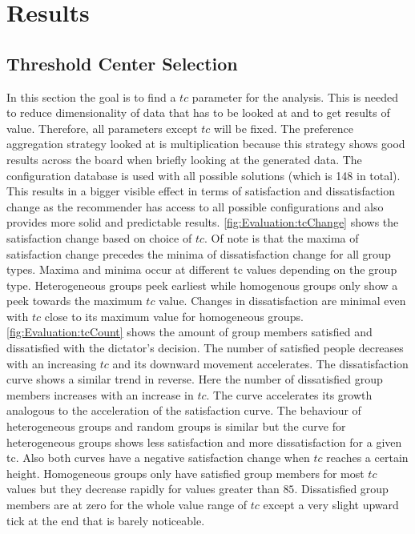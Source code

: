 \section{Results}
\label{sec:Evaluation:Findings}

\subsection{Threshold Center Selection}

In this section the goal is to find a $tc$ parameter for the analysis. This is needed to reduce dimensionality of data that has to be looked at and to get results of value. Therefore, all parameters except $tc$ will be fixed. The preference aggregation strategy looked at is multiplication because this strategy shows good results across the board when briefly looking at the generated data. The configuration database is used with all possible solutions (which is 148 in total). This results in a bigger visible effect in terms of satisfaction and dissatisfaction change as the recommender has access to all possible configurations and also provides more solid and predictable results. \autoref{fig:Evaluation:tcChange} shows the satisfaction change based on choice of $tc$. Of note is that the maxima of satisfaction change precedes the minima of dissatisfaction change for all group types. Maxima and minima occur at different tc values depending on the group type. Heterogeneous groups peek earliest while homogenous groups only show a peek towards the maximum $tc$ value. Changes in dissatisfaction are minimal even with $tc$ close to its maximum value for homogeneous groups. \autoref{fig:Evaluation:tcCount} shows the amount of group members satisfied and dissatisfied with the dictator's decision. The number of satisfied people decreases with an increasing $tc$ and its downward movement accelerates. The dissatisfaction curve shows a similar trend in reverse. Here the number of dissatisfied group members increases with an increase in $tc$. The curve accelerates its growth analogous to the acceleration of the satisfaction curve. The behaviour of heterogeneous groups and random groups is similar but the curve for heterogeneous groups shows less satisfaction and more dissatisfaction for a given tc. Also both curves have a negative satisfaction change when $tc$ reaches a certain height. Homogeneous groups only have satisfied group members for most $tc$ values but they decrease rapidly for values greater than $85$. Dissatisfied group members are at zero for the whole value range of $tc$ except a very slight upward tick at the end that is barely noticeable.

